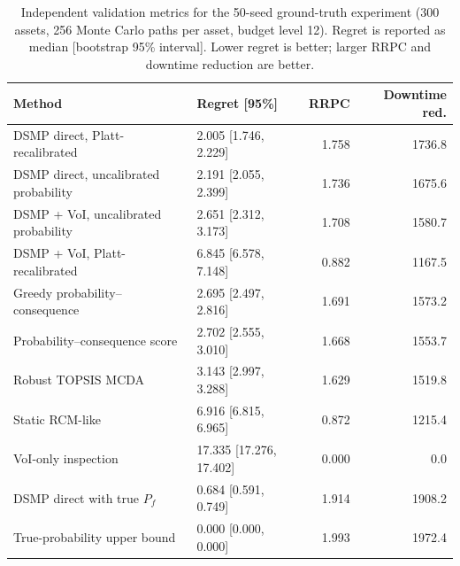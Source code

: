 \begin{table}[t]
\centering
\scriptsize
\caption{Independent validation metrics for the 50-seed ground-truth experiment (300 assets, 256 Monte Carlo paths per asset, budget level 12). Regret is reported as median [bootstrap 95\% interval]. Lower regret is better; larger RRPC and downtime reduction are better.}
\label{tab:validation-main}
\begin{tabular*}{\textwidth}{@{\extracolsep{\fill}}p{}p{}rr}
\toprule
Method & Regret [95\%] & RRPC & Downtime red. \\
\midrule
DSMP direct, Platt-recalibrated & 2.005 [1.746, 2.229] & 1.758 & 1736.8 \\
DSMP direct, uncalibrated probability & 2.191 [2.055, 2.399] & 1.736 & 1675.6 \\
DSMP + VoI, uncalibrated probability & 2.651 [2.312, 3.173] & 1.708 & 1580.7 \\
DSMP + VoI, Platt-recalibrated & 6.845 [6.578, 7.148] & 0.882 & 1167.5 \\
Greedy probability--consequence & 2.695 [2.497, 2.816] & 1.691 & 1573.2 \\
Probability--consequence score & 2.702 [2.555, 3.010] & 1.668 & 1553.7 \\
Robust TOPSIS MCDA & 3.143 [2.997, 3.288] & 1.629 & 1519.8 \\
Static RCM-like & 6.916 [6.815, 6.965] & 0.872 & 1215.4 \\
VoI-only inspection & 17.335 [17.276, 17.402] & 0.000 & 0.0 \\
\midrule
DSMP direct with true $P_f$ & 0.684 [0.591, 0.749] & 1.914 & 1908.2 \\
True-probability upper bound & 0.000 [0.000, 0.000] & 1.993 & 1972.4 \\
\bottomrule
\end{tabular*}
\end{table}
